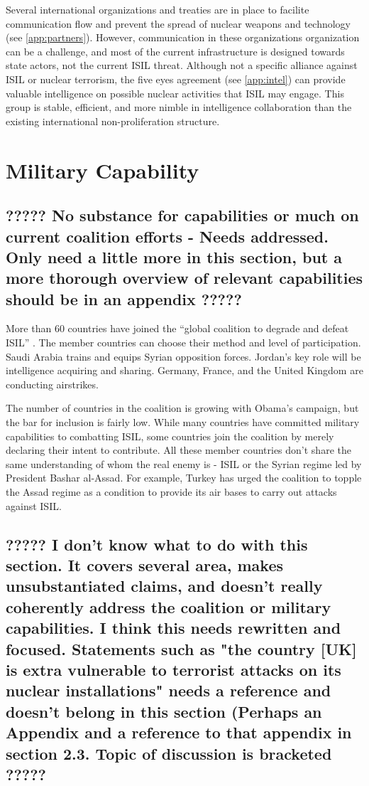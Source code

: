 \documentclass{report}
\begin{document}
Several international organizations and treaties are in place to facilite communication flow and prevent the spread of nuclear weapons and technology (see \autoref{app:partners}).  However, communication in these organizations organization can be a challenge, and most of the current infrastructure is designed towards state actors, not the current ISIL threat.  Although not a specific alliance against ISIL or nuclear terrorism, the five eyes agreement (see \autoref{app:intel}) can provide valuable intelligence on possible nuclear activities that ISIL may engage. This group is stable, efficient, and more nimble in intelligence collaboration than the existing international non-proliferation structure.  

\section{Military Capability}

\subsection{????? No substance for capabilities or much on current coalition efforts - Needs addressed.  Only need a little more in this section, but a more thorough overview of relevant capabilities should be in an appendix ?????}



More than 60 countries have joined the \enquote{global coalition to degrade and defeat ISIL} \cite{Drennan2014}. The member countries can choose their method and level of participation. Saudi Arabia trains and equips Syrian opposition forces. Jordan's key role will be intelligence acquiring and sharing. Germany, France, and the United Kingdom are conducting airstrikes. 

The number of countries in the coalition is growing with Obama's campaign, but the bar for inclusion is fairly low. While many countries have committed military capabilities to combatting ISIL, some countries join the coalition by merely declaring their intent to contribute. All these member countries don't share the same understanding of whom the real enemy is - ISIL or the Syrian regime led by President Bashar al-Assad. For example, Turkey has urged the coalition to topple the Assad regime as a condition to provide its air bases to carry out attacks against ISIL. 

\subsection{????? I don't know what to do with this section.  It covers several area, makes unsubstantiated claims, and doesn't really coherently address the coalition or military capabilities.  I think this needs rewritten and focused.  Statements such as "the country [UK] is extra vulnerable to terrorist attacks on its nuclear installations" needs a reference and doesn't belong in this section (Perhaps an Appendix and a reference to that appendix in section 2.3.  Topic of discussion is bracketed ?????}
\end{document}
